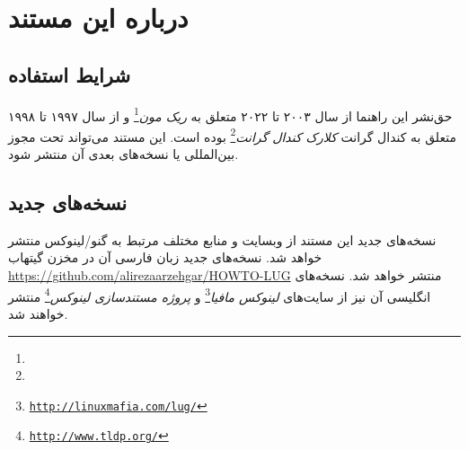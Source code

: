 \section{درباره این مستند}

\subsection{شرایط استفاده}

حق‌نشر این راهنما از سال ۲۰۰۳ تا ۲۰۲۲ متعلق به
\emph{ریک مون}\footnote{}
و از سال ۱۹۹۷ تا ۱۹۹۸ متعلق به
کندال گرانت
\emph{کلارک کندال گرانت}\footnote{}
بوده است.
این مستند می‌تواند تحت مجوز بین‌المللی
یا نسخه‌های بعدی آن منتشر شود.

\subsection{نسخه‌های جدید}

نسخه‌های جدید این مستند از وبسایت و منابع مختلف مرتبط به گنو/لینوکس منتشر خواهد شد.
نسخه‌های جدید زبان فارسی آن در مخزن گیتهاب
\url{https://github.com/alirezaarzehgar/HOWTO-LUG}
منتشر خواهد شد.
نسخه‌های انگلیسی آن نیز از سایت‌های
\emph{لینوکس مافیا}\footnote{\texttt{\url{http://linuxmafia.com/lug/}}}
و
\emph{پروژه مستندسازی لینوکس}\footnote{\texttt{\url{http://www.tldp.org/}}}
منتشر خواهند شد.

